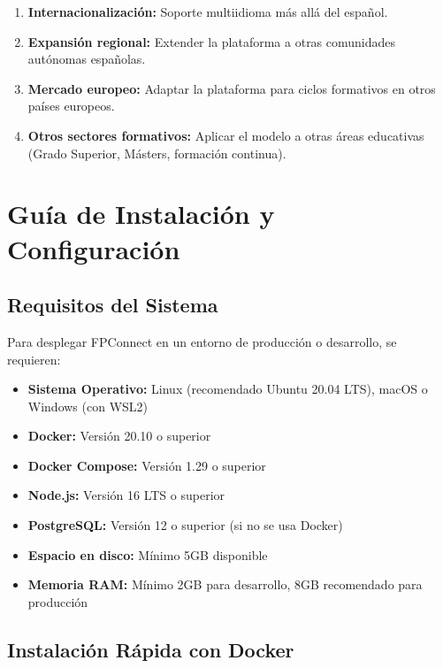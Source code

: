 \documentclass[a4paper]{report}
\begin{document}
\begin{enumerate}
  \item \textbf{Internacionalización:} Soporte multiidioma más allá del español.
  
  \item \textbf{Expansión regional:} Extender la plataforma a otras comunidades autónomas españolas.
  
  \item \textbf{Mercado europeo:} Adaptar la plataforma para ciclos formativos en otros países europeos.
  
  \item \textbf{Otros sectores formativos:} Aplicar el modelo a otras áreas educativas (Grado Superior, Másters, formación continua).
\end{enumerate}

\newpage

\appendix
\chapter{Guía de Instalación y Configuración}

\section{Requisitos del Sistema}

Para desplegar FPConnect en un entorno de producción o desarrollo, se requieren:

\begin{itemize}
  \item \textbf{Sistema Operativo:} Linux (recomendado Ubuntu 20.04 LTS), macOS o Windows (con WSL2)
  \item \textbf{Docker:} Versión 20.10 o superior
  \item \textbf{Docker Compose:} Versión 1.29 o superior
  \item \textbf{Node.js:} Versión 16 LTS o superior
  \item \textbf{PostgreSQL:} Versión 12 o superior (si no se usa Docker)
  \item \textbf{Espacio en disco:} Mínimo 5GB disponible
  \item \textbf{Memoria RAM:} Mínimo 2GB para desarrollo, 8GB recomendado para producción
\end{itemize}

\section{Instalación Rápida con Docker}
\end{document}
